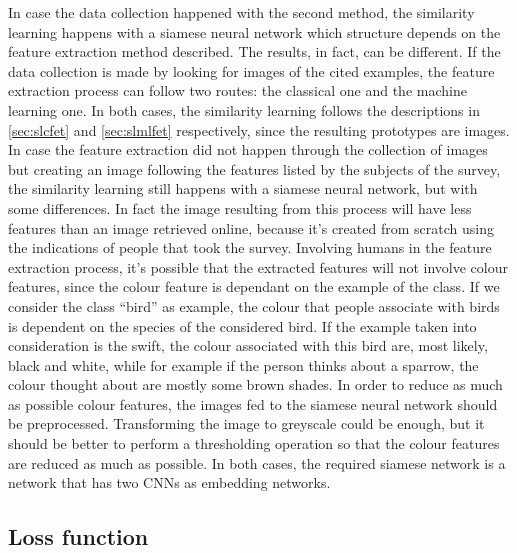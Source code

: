 \documentclass[conference]{IEEEtran}
\begin{document}
			\noindent In case the data collection happened with the second method, the similarity learning happens with a siamese neural network which structure depends on the feature extraction method described. The 
			results, in fact, can be different. If the data collection is made by looking for images of the cited examples, the feature extraction process can follow two routes: the classical one and the machine learning 
			one. In both cases, the similarity learning follows the descriptions in \ref{sec:slcfet} and \ref{sec:slmlfet} respectively, since the resulting prototypes are images. In case the feature extraction did not happen through 
			the collection of images but creating an image following the features listed by the subjects of the survey, the similarity learning still happens with a siamese neural network, but with some differences. In fact 
			the image resulting from this process will have less features than an image retrieved online, because it's created from scratch using the indications of people that took the survey. Involving humans in 
			the feature extraction process, it's possible that the extracted features will not involve colour features, since the colour feature is dependant on the example of the class. If we consider the class ``bird'' as
			example, the colour that people associate with birds is dependent on the species of the considered bird. If the example taken into consideration is the swift, the colour associated with this bird are, most likely, 
			black and white, while for example if the person thinks about a sparrow, the colour thought about are mostly some brown shades. In order to reduce as much as possible colour features, the images fed to 
			the siamese neural network should be preprocessed. Transforming the image to greyscale could be enough, but it should be better to perform a thresholding operation so that the colour features are reduced as much 
			as possible. In both cases, the required siamese network is a network that has two CNNs as embedding networks. 
		
		\subsection{Loss function}
		
\end{document}
